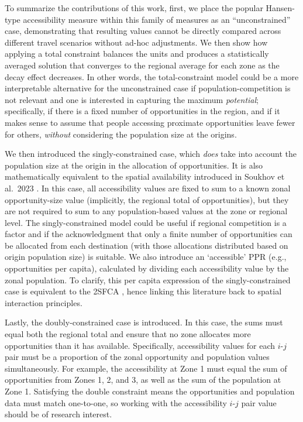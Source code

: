 \documentclass[
  10pt,
  letterpaper,
]{article}
\begin{document}
To summarize the contributions of this work, first, we place the popular
Hansen-type accessibility measure \citep{hansen1959} within this family
of measures as an ``unconstrained'' case, demonstrating that resulting
values cannot be directly compared across different travel scenarios
without ad-hoc adjustments. We then show how applying a total constraint
balances the units and produces a statistically averaged solution that
converges to the regional average for each zone as the decay effect
decreases. In other words, the total-constraint model could be a more
interpretable alternative for the unconstrained case if
population-competition is not relevant and one is interested in
capturing the maximum \emph{potential}; specifically, if there is a
fixed number of opportunities in the region, and if it makes sense to
assume that people accessing proximate opportunities leave fewer for
others, \emph{without} considering the population size at the origins.

We then introduced the singly-constrained case, which \emph{does} take
into account the population size at the origin in the allocation of
opportunities. It is also mathematically equivalent to the spatial
availability introduced in Soukhov et al.~2023
\citep{soukhovIntroducingSpatialAvailability2023}. In this case, all
accessibility values are fixed to sum to a known zonal opportunity-size
value (implicitly, the regional total of opportunities), but they are
not required to sum to any population-based values at the zone or
regional level. The singly-constrained model could be useful if regional
competition is a factor and if the acknowledgment that only a finite
number of opportunities can be allocated from each destination (with
those allocations distributed based on origin population size) is
suitable. We also introduce an `accessible' PPR (e.g., opportunities per
capita), calculated by dividing each accessibility value by the zonal
population. To clarify, this per capita expression of the
singly-constrained case is equivalent to the 2SFCA
\citep{luo2003, shen1998}, hence linking this literature back to spatial
interaction principles.

Lastly, the doubly-constrained case is introduced. In this case, the
sums must equal both the regional total and ensure that no zone
allocates more opportunities than it has available. Specifically,
accessibility values for each \(i\)-\(j\) pair must be a proportion of
the zonal opportunity and population values simultaneously. For example,
the accessibility at Zone 1 must equal the sum of opportunities from
Zones 1, 2, and 3, as well as the sum of the population at Zone 1.
Satisfying the double constraint means the opportunities and population
data must match one-to-one, so working with the accessibility
\(i\)-\(j\) pair value should be of research interest.
\end{document}
